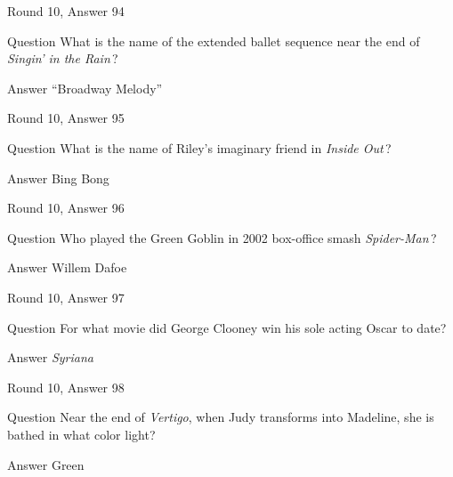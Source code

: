 \documentclass[11pt]{beamer}
\begin{document}
\begin{frame}[t]{Round 10, Answer 94}
\vspace{2em}
\begin{block}{Question}
What is the name of the extended ballet sequence near the end of \emph{Singin' in the Rain}\,?
\end{block}
\pause{}
\begin{block}{Answer}
``Broadway Melody''
\end{block}
\end{frame}
    

\begin{frame}[t]{Round 10, Answer 95}
\vspace{2em}
\begin{block}{Question}
What is the name of Riley's imaginary friend in \emph{Inside Out}\,?
\end{block}
\pause{}
\begin{block}{Answer}
Bing Bong
\end{block}
\end{frame}
    

\begin{frame}[t]{Round 10, Answer 96}
\vspace{2em}
\begin{block}{Question}
Who played the Green Goblin in 2002 box-office smash \emph{Spider-Man}\,?
\end{block}
\pause{}
\begin{block}{Answer}
Willem Dafoe
\end{block}
\end{frame}
    

\begin{frame}[t]{Round 10, Answer 97}
\vspace{2em}
\begin{block}{Question}
For what movie did George Clooney win his sole acting Oscar to date?
\end{block}
\pause{}
\begin{block}{Answer}
\emph{Syriana}
\end{block}
\end{frame}
    

\begin{frame}[t]{Round 10, Answer 98}
\vspace{2em}
\begin{block}{Question}
Near the end of \emph{Vertigo}, when Judy transforms into Madeline, she is bathed in what color light?
\end{block}
\pause{}
\begin{block}{Answer}
Green
\end{block}
\end{frame}
    
\end{document}
